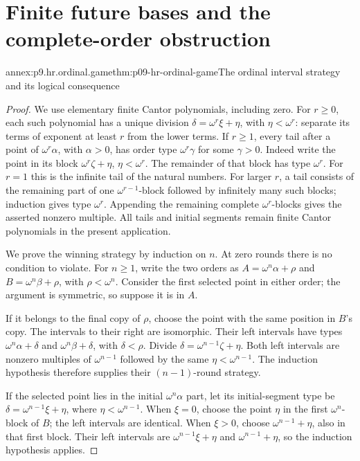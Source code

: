 
\section{Finite future bases and the complete-order obstruction}
\label{sec:annex-p09-gpss-complete-order-complement}

\begin{annexitem}{annex:p9.hr.ordinal.game}{thm:p09-hr-ordinal-game}{The ordinal interval strategy and its logical consequence}
\begin{proof}
We use elementary finite Cantor polynomials, including zero.
For \(r\geq0\), each such polynomial has a unique division
\(\delta=\omega^r\xi+\eta\), with \(\eta<\omega^r\):
separate its terms of exponent at least \(r\) from the
lower terms. If \(r\geq1\), every tail after a point of
\(\omega^r\alpha\), with \(\alpha>0\), has order type
\(\omega^r\gamma\) for some \(\gamma>0\).
Indeed write the point in its block
\(\omega^r\zeta+\eta\), \(\eta<\omega^r\).
The remainder of that block has type \(\omega^r\).
For \(r=1\) this is the infinite tail of the natural
numbers. For larger \(r\), a tail consists of the
remaining part of one \(\omega^{r-1}\)-block followed
by infinitely many such blocks; induction gives
type \(\omega^r\). Appending the remaining complete
\(\omega^r\)-blocks gives the asserted nonzero multiple.
All tails and initial segments remain finite Cantor
polynomials in the present application.

We prove the winning strategy by induction on \(n\).
At zero rounds there is no condition to violate.
For \(n\geq1\), write the two orders as
\(A=\omega^n\alpha+\rho\) and
\(B=\omega^n\beta+\rho\), with \(\rho<\omega^n\).
Consider the first selected point in either order;
the argument is symmetric, so suppose it is in \(A\).

If it belongs to the final copy of \(\rho\), choose
the point with the same position in \(B\)'s copy.
The intervals to their right are isomorphic.
Their left intervals have types
\(\omega^n\alpha+\delta\) and
\(\omega^n\beta+\delta\), with \(\delta<\rho\).
Divide \(\delta=\omega^{n-1}\zeta+\eta\).
Both left intervals are nonzero multiples of
\(\omega^{n-1}\) followed by the same
\(\eta<\omega^{n-1}\). The induction hypothesis
therefore supplies their \((n-1)\)-round strategy.

If the selected point lies in the initial
\(\omega^n\alpha\) part, let its initial-segment
type be \(\delta=\omega^{n-1}\xi+\eta\),
where \(\eta<\omega^{n-1}\).
When \(\xi=0\), choose the point \(\eta\) in
the first \(\omega^n\)-block of \(B\);
the left intervals are identical.
When \(\xi>0\), choose
\(\omega^{n-1}+\eta\), also in that first
block. Their left intervals are
\(\omega^{n-1}\xi+\eta\) and
\(\omega^{n-1}+\eta\), so the induction
hypothesis applies.


\end{proof}
\end{annexitem}
